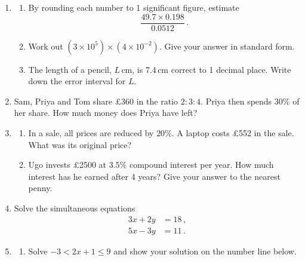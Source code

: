\documentclass[12pt,a4paper]{article}
\begin{document}
\begin{enumerate}
    \item 
    \begin{enumerate}
        \item By rounding each number to 1 significant figure, estimate
        \begin{equation*}
            \frac{49.7 \times 0.198}{0.0512}\,.
        \end{equation*}
        \vspace{1.5cm}
        \item Work out $(3 \times 10^{5}) \times (4 \times 10^{-2})$. Give your answer in standard form.
        \vspace{1.5cm}
        \item The length of a pencil, $L$\,cm, is $7.4$\,cm correct to 1 decimal place. Write down the error interval for $L$.
        \vspace{1.5cm}
    \end{enumerate}

    \item Sam, Priya and Tom share \pounds 360 in the ratio $2 : 3 : 4$. Priya then spends $30\%$ of her share. How much money does Priya have left?

    \vspace{3cm}

    \item
    \begin{enumerate}
        \item In a sale, all prices are reduced by $20\%$. A laptop costs \pounds 552 in the sale. What was its original price?
        \vspace{2cm}
        \item Ugo invests \pounds 2500 at $3.5\%$ compound interest per year. How much interest has he earned after 4 years? Give your answer to the nearest penny.
        \vspace{2cm}
    \end{enumerate}

    \item Solve the simultaneous equations
    \begin{align*}
        3x + 2y &= 18\,,\\
        5x - 3y &= 11\,.
    \end{align*}

    \vspace{3cm}

    \item 
    \begin{enumerate}
        \item Solve $-3 < 2x + 1 \le 9$ and show your solution on the number line below.


\end{enumerate}
\end{enumerate}
\end{document}

